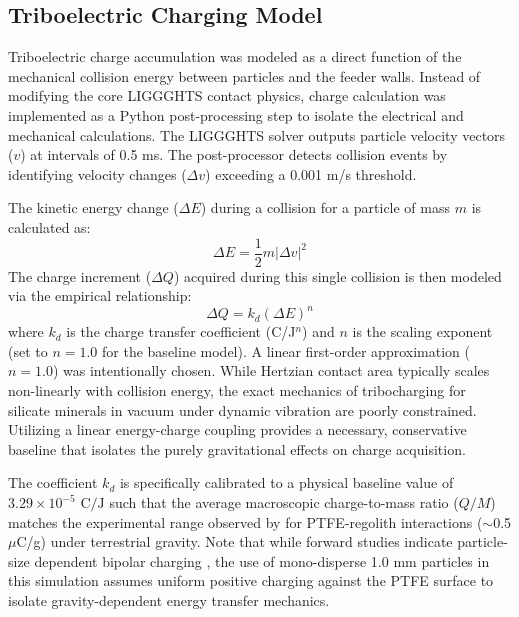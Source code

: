 \documentclass[preprint,12pt,authoryear]{elsarticle}
\begin{document}
\subsection{Triboelectric Charging Model}
\label{sec:tribo_model}
Triboelectric charge accumulation was modeled as a direct function of the mechanical collision energy between particles and the feeder walls. Instead of modifying the core LIGGGHTS contact physics, charge calculation was implemented as a Python post-processing step to isolate the electrical and mechanical calculations. The LIGGGHTS solver outputs particle velocity vectors ($v$) at intervals of 0.5 ms. The post-processor detects collision events by identifying velocity changes ($\Delta v$) exceeding a 0.001 m/s threshold. 

The kinetic energy change ($\Delta E$) during a collision for a particle of mass $m$ is calculated as:
\begin{equation}
\Delta E = \frac{1}{2} m |\Delta v|^2
\end{equation}
The charge increment ($\Delta Q$) acquired during this single collision is then modeled via the empirical relationship:
\begin{equation}
\Delta Q = k_d (\Delta E)^n
\end{equation}
where $k_d$ is the charge transfer coefficient (C/J$^n$) and $n$ is the scaling exponent (set to $n=1.0$ for the baseline model). A linear first-order approximation ($n=1.0$) was intentionally chosen. While Hertzian contact area typically scales non-linearly with collision energy, the exact mechanics of tribocharging for silicate minerals in vacuum under dynamic vibration are poorly constrained. Utilizing a linear energy-charge coupling provides a necessary, conservative baseline that isolates the purely gravitational effects on charge acquisition.

The coefficient $k_d$ is specifically calibrated to a physical baseline value of $3.29 \times 10^{-5}\text{ C/J}$ such that the average macroscopic charge-to-mass ratio ($Q/M$) matches the experimental range observed by \cite{Trigwell2009} for PTFE-regolith interactions ($\sim$0.5 $\mu$C/g) under terrestrial gravity. Note that while forward studies indicate particle-size dependent bipolar charging \citep{Forward2009}, the use of mono-disperse 1.0 mm particles in this simulation assumes uniform positive charging against the PTFE surface to isolate gravity-dependent energy transfer mechanics.
\end{document}
